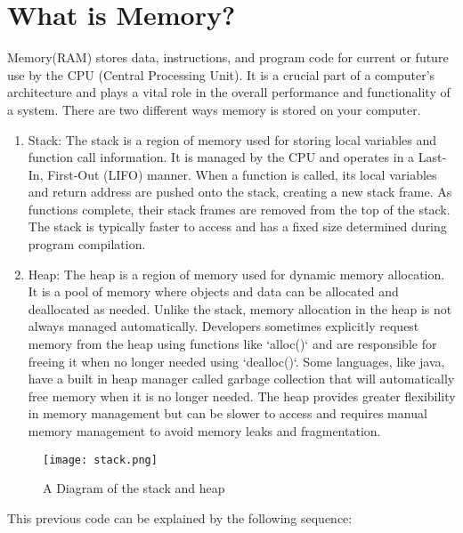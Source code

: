 \documentclass[12pt, letterpaper]{article}
\begin{document}
\section{What is Memory?}

Memory(RAM) stores data, instructions, and program code for current or future use by the CPU (Central Processing Unit). It is a crucial part of a computer's architecture and plays a vital role in the overall performance and functionality of a system. There are two different ways memory is stored on your computer.

\begin{enumerate}
      \item Stack: The stack is a region of memory used for storing local variables and function call information. It is managed by the CPU and operates in a Last-In, First-Out (LIFO) manner. When a function is called, its local variables and return address are pushed onto the stack, creating a new stack frame. As functions complete, their stack frames are removed from the top of the stack. The stack is typically faster to access and has a fixed size determined during program compilation.
      \item Heap: The heap is a region of memory used for dynamic memory allocation. It is a pool of memory where objects and data can be allocated and deallocated as needed. Unlike the stack, memory allocation in the heap is not always managed automatically. Developers sometimes explicitly request memory from the heap using functions like `alloc()` and are responsible for freeing it when no longer needed using `dealloc()`.  Some languages, like java, have a built in heap manager called garbage collection that will automatically free memory when it is no longer needed. The heap provides greater flexibility in memory management but can be slower to access and requires manual memory management to avoid memory leaks and fragmentation.
\end{enumerate}

\begin{figure}[H]
      \centering
      \texttt{[image: stack.png]}
      \caption{A Diagram of the stack and heap}
      \label{fig:stack}
\end{figure}

\begin{Large} \center \noindent This previous code can be explained by the following sequence: \end{Large}

\bigskip
\end{document}
